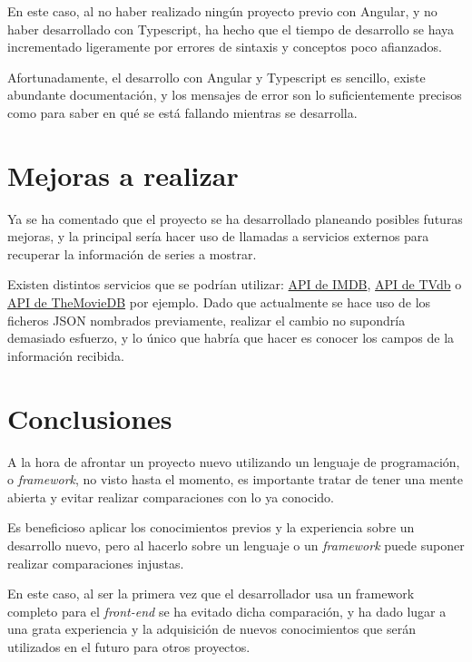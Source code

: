 \documentclass{\ClassPath/viu-tfm-template}
\begin{document}
En este caso, al no haber realizado ningún proyecto previo con Angular, y no haber desarrollado con Typescript, ha hecho que el tiempo de desarrollo se haya incrementado ligeramente por errores de sintaxis y conceptos poco afianzados.

Afortunadamente, el desarrollo con Angular y Typescript es sencillo, existe abundante documentación, y los mensajes de error son lo suficientemente precisos como para saber en qué se está fallando mientras se desarrolla.



\chapter{Mejoras a realizar}

Ya se ha comentado que el proyecto se ha desarrollado planeando posibles futuras mejoras, y la principal sería hacer uso de llamadas a servicios externos para recuperar la información de series a mostrar.

Existen distintos servicios que se podrían utilizar:  \href{https://imdb-api.com/API}{API de IMDB}, \href{https://thetvdb.com/api-information}{API de TVdb} o \href{https://www.themoviedb.org/documentation/api}{API de TheMovieDB} por ejemplo. Dado que actualmente se hace uso de los ficheros JSON nombrados previamente, realizar el cambio no supondría demasiado esfuerzo, y lo único que habría que hacer es conocer los campos de la información recibida.


\chapter{Conclusiones}

A la hora de afrontar un proyecto nuevo utilizando un lenguaje de programación, o \textit{framework}, no visto hasta el momento, es importante tratar de tener una mente abierta y evitar realizar comparaciones con lo ya conocido.

Es beneficioso aplicar los conocimientos previos y la experiencia sobre un desarrollo nuevo, pero al hacerlo sobre un lenguaje o un \textit{framework} puede suponer realizar comparaciones injustas.

En este caso, al ser la primera vez que el desarrollador usa un framework completo para el \textit{front-end} se ha evitado dicha comparación, y ha dado lugar a una grata experiencia y la adquisición de nuevos conocimientos que serán utilizados en el futuro para otros proyectos.
\end{document}
